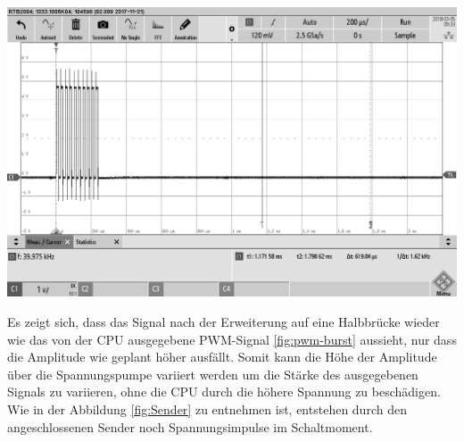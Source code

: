 \begin{minipage}{0.5\textwidth}
\includegraphics[width=1\textwidth, draft
]{Abbildungen/MessungenP1/PWM-Nach-der-Halbbrucke-mit-LS.png}
\label{fig:Sender}
\end{minipage}
Es zeigt sich, dass das Signal nach der Erweiterung auf eine Halbbrücke wieder wie das von der CPU ausgegebene PWM-Signal \ref{fig:pwm-burst} aussieht, nur dass die Amplitude wie geplant höher ausfällt. Somit kann die Höhe der Amplitude über die Spannungspumpe variiert werden um die Stärke des ausgegebenen Signals zu variieren, ohne die CPU durch die höhere Spannung zu beschädigen.
Wie in der Abbildung \ref{fig:Sender} zu entnehmen ist, entstehen durch den angeschlossenen Sender noch Spannungsimpulse im Schaltmoment.

